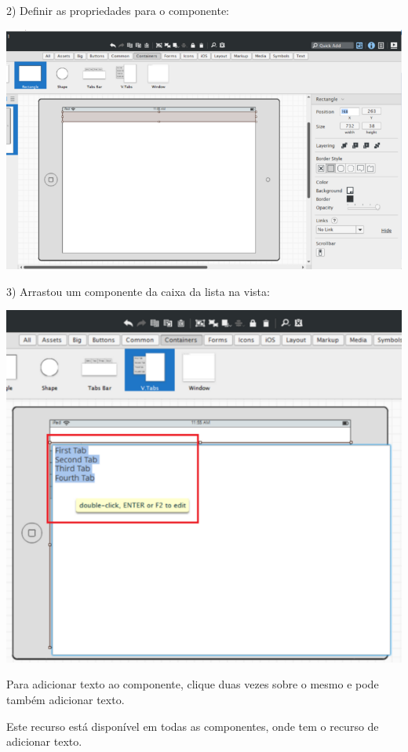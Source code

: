 \documentclass{tufte-book} %
\begin{document}
2) Definir as propriedades para o componente:

\begin{center}
	\includegraphics{img12.png}
\end{center}

\break

3) Arrastou um componente da caixa da lista na vista:

\begin{center}
	\includegraphics{img13.png}
\end{center}

Para adicionar texto ao componente, clique duas vezes sobre o mesmo e pode também adicionar texto.

Este recurso está disponível em todas as componentes, onde tem o recurso de adicionar texto.
\end{document}
